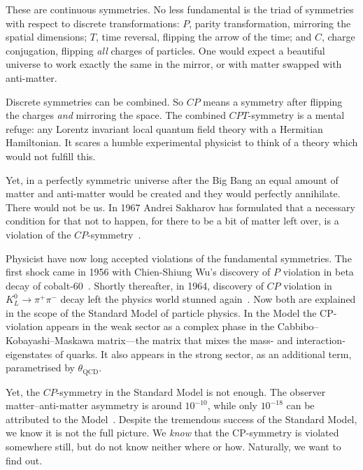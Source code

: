 These are continuous symmetries. No less fundamental is the triad of symmetries with respect to discrete transformations: $P$, parity transformation, mirroring the spatial dimensions; $T$, time reversal, flipping the arrow of the time; and $C$, charge conjugation, flipping \emph{all} charges of particles. One would expect a beautiful universe to work exactly the same in the mirror, or with matter swapped with anti-matter.

Discrete symmetries can be combined. So $CP$ means a symmetry after flipping the charges \emph{and} mirroring the space. The combined $CPT$-symmetry is a mental refuge: any Lorentz invariant local quantum field theory with a Hermitian Hamiltonian. It scares a humble experimental physicist to think of a theory which would not fulfill this.

Yet, in a perfectly symmetric universe after the Big Bang an equal amount of matter and anti-matter would be created and they would perfectly annihilate. There would not be us.
In 1967 Andrei Sakharov
has formulated that a necessary condition for that not to happen, for there to be a bit of matter left over, is a violation of the $CP$-symmetry~\cite{0038-5670-34-5-A08}.

Physicist have now long accepted violations of the fundamental symmetries.
The first shock came in 1956 with Chien-Shiung Wu's discovery of $P$ violation in beta decay of cobalt-60~\cite{PhysRev.105.1413}. Shortly thereafter, in 1964, discovery of $CP$ violation in $K^0_L \rightarrow \pi^+ \pi^-$ decay left the physics world stunned again~\cite{PhysRevLett.13.138}. Now both are explained in the scope of the Standard Model of particle physics. In the Model the CP-violation appears in the weak sector as a complex phase in the Cabbibo--Kobayashi--Maskawa matrix---the matrix that mixes the mass- and interaction-eigenstates of quarks. It also appears in the strong sector, as an additional term, parametrised by $\theta_\text{QCD}$. 

Yet, the $CP$-symmetry in the Standard Model is not enough. The observer matter--anti-matter asymmetry is around $10^{-10}$, while only $10^{-18}$ can be attributed to the Model~\cite{Riotto1999}. Despite the tremendous success of the Standard Model, we know it is not the full picture. We \emph{know} that the CP-symmetry is violated somewhere still, but do not know neither where or how. Naturally, we want to find out. %

